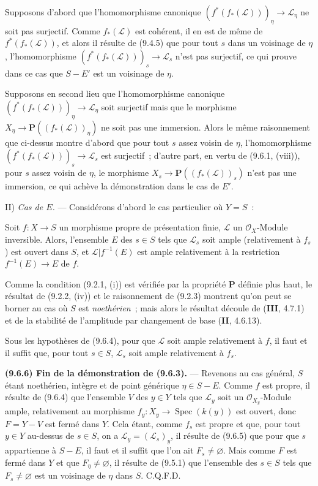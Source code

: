 Supposons d'abord que l'homomorphisme canonique
$(f^*(f_*(\mathcal L)))_\eta\to\mathcal L_\eta$ ne soit pas surjectif. Comme
$f_*(\mathcal L)$ est cohérent, il en est de même de $f^*(f_*(\mathcal L))$,
et alors il résulte de (9.4.5) que pour tout $s$ dans un voisinage de $\eta$,
l'homomorphisme $(f^*(f_*(\mathcal L)))_s\to\mathcal L_s$ n'est pas
surjectif, ce qui prouve dans ce cas que $S-E'$ est un voisinage de $\eta$.

Supposons en second lieu que l'homomorphisme canonique
$(f^*(f_*(\mathcal L)))_\eta\to\mathcal L_\eta$ soit surjectif mais que le
morphisme $X_\eta\to\mathbf P((f_*(\mathcal L))_\eta)$ ne soit pas une
immersion. Alors le même raisonnement que ci-dessus montre d'abord que pour
tout $s$ assez voisin de $\eta$, l'homomorphisme
$(f^*(f_*(\mathcal L)))_s\to\mathcal L_s$ est surjectif~; d'autre part, en
vertu de (9.6.1, (viii)), pour $s$ assez voisin de $\eta$, le morphisme
$X_s\to\mathbf P((f_*(\mathcal L))_s)$ n'est pas une immersion, ce qui achève
la démonstration dans le cas de $E'$.

II) \emph{Cas de $E$.} --- Considérons d'abord le cas particulier où $Y=S$~:

\begin{corollary}[9.6.4]
\label{IV.9.6.4-fr}
Soit $f:X\to S$ un morphisme propre de présentation finie, $\mathcal L$ un
$\mathcal O_X$-Module inversible. Alors, l'ensemble $E$ des $s\in S$ tels que
$\mathcal L_s$ soit ample (relativement à $f_s$) est ouvert dans $S$, et
$\mathcal L|f^{-1}(E)$ est ample relativement à la restriction
$f^{-1}(E)\to E$ de $f$.
\end{corollary}

Comme la condition (9.2.1, (i)) est vérifiée par la propriété $\mathbf P$ définie plus
haut, le résultat de (9.2.2, (iv)) et le raisonnement de (9.2.3) montrent qu'on
peut se borner au cas où $S$ est \emph{noethérien}~; mais alors le résultat
découle de (\textbf{III}, 4.7.1) et de la stabilité de l'amplitude par
changement de base (\textbf{II}, 4.6.13).

\begin{corollary}[9.6.5]
\label{IV.9.6.5-fr}
Sous les hypothèses de (9.6.4), pour que $\mathcal L$ soit ample relativement
à $f$, il faut et il suffit que, pour tout $s\in S$, $\mathcal L_s$ soit ample
relativement à $f_s$.
\end{corollary}

\label{IV.9.6.6-fr}%
\textbf{(9.6.6) Fin de la démonstration de (9.6.3).} --- Revenons au cas
général, $S$ étant noethérien, intègre et de point générique
$\eta\in S-E$. Comme $f$ est propre, il résulte de (9.6.4) que l'ensemble $V$
des $y\in Y$ tels que $\mathcal L_y$ soit un $\mathcal O_{X_y}$-Module ample,
relativement au morphisme $f_y:X_y\to\operatorname{Spec}(k(y))$ est ouvert,
donc $F=Y-V$ est fermé dans $Y$. Cela étant, comme $f_s$ est propre et que,
pour tout $y\in Y$ au-dessus de $s\in S$, on a
$\mathcal L_y=(\mathcal L_s)_y$, il résulte de (9.6.5) que pour que $s$
appartienne à $S-E$, il faut et il suffit que l'on ait $F_s\neq\varnothing$.
Mais comme $F$ est fermé dans $Y$ et que $F_\eta\neq\varnothing$, il résulte
de (9.5.1) que l'ensemble des $s\in S$ tels que $F_s\neq\varnothing$ est un
voisinage de $\eta$ dans $S$. C.Q.F.D.

